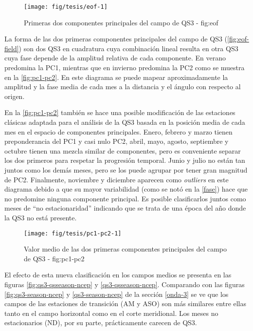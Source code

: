 \documentclass[spanish,a4paper,12p]{book}
\begin{document}
\begin{figure*}
\texttt{[image: fig/tesis/eof-1]} \caption{Primeras dos componentes principales del campo de QS3 - fig:eof}\label{fig:eof}
\end{figure*}

La forma de las dos primeras componentes principales del campo de QS3
(\autoref{fig:eof-field}) son dos QS3 en cuadratura cuya combinación
lineal resulta en otra QS3 cuya fase depende de la amplitud relativa de
cada componente. En verano predomina la PC1, mientras que en invierno
predomina la PC2 como se muestra en la \autoref{fig:pc1-pc2}. En este
diagrama se puede mapear aproximadamente la amplitud y la fase media de
cada mes a la distancia y el ángulo con respecto al origen.

En la \autoref{fig:pc1-pc2} también se hace una posible modificación de
las estaciones clásicas adaptada para el análisis de la QS3 basada en la
posición media de cada mes en el espacio de componentes principales.
Enero, febrero y marzo tienen preponderancia del PC1 y casi nulo PC2,
abril, mayo, agosto, septiembre y octubre tienen una mezcla similar de
componentes, pero es conveniente separar los dos primeros para respetar
la progresión temporal. Junio y julio no están tan juntos como los demás
meses, pero se los puede agrupar por tener gran magnitud de PC2.
Finalmente, noviembre y diciembre aparecen como \emph{outliers} en este
diagrama debido a que su mayor variabilidad (como se notó en la
\autoref{fase}) hace que no predomine ninguna componente principal. Es
posible clasificarlos juntos como meses de ``no estacionaridad''
indicando que se trata de una época del año donde la QS3 no está
presente.

\begin{figure*}
\texttt{[image: fig/tesis/pc1-pc2-1]} \caption{Valor medio de las dos primeras componentes principales del campo de QS3 - fig:pc1-pc2}\label{fig:pc1-pc2}
\end{figure*}

El efecto de esta nueva clasificación en los campos medios se presenta
en las figuras \ref{fig:qs3-qsseason-ncep} y \ref{qs3-qsseason-ncep}.
Comparando con las figuras \ref{fig:qs3-season-ncep} y
\ref{qs3-season-ncep} de la sección \ref{onda-3} se ve que los campos de
las estaciones de transición (AM y ASO) son más similares entre ellas
tanto en el campo horizontal como en el corte meridional. Los meses no
estacionarios (ND), por su parte, prácticamente carecen de QS3.
\end{document}

